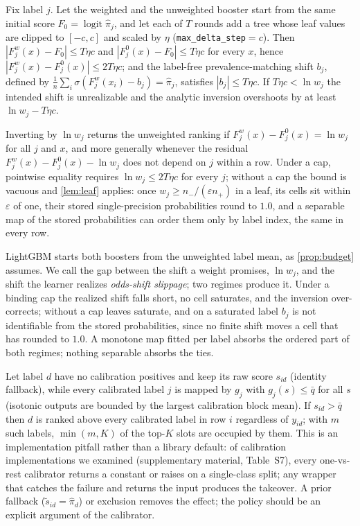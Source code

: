 \documentclass[runningheads]{llncs}
\newcommand{\Supp}[1]{supplementary material, #1}  %
\begin{document}
\begin{proposition}
\label{prop:budget}
Fix label $j$. Let the weighted and the unweighted booster start from the same initial score $F_0=\operatorname{logit}\hat\pi_j$, and let each of $T$ rounds add a tree whose leaf values are clipped to $[-c,c]$ and scaled by $\eta$ (\texttt{max\_delta\_step}$=c$). Then $|F^{w}_j(x)-F_0|\le T\eta c$ and $|F^{0}_j(x)-F_0|\le T\eta c$ for every $x$, hence $|F^{w}_j(x)-F^{0}_j(x)|\le 2T\eta c$; and the label-free prevalence-matching shift $b_j$, defined by $\frac1n\sum_i\sigma(F^{w}_j(x_i)-b_j)=\hat\pi_j$, satisfies $|b_j|\le T\eta c$. If $T\eta c<\ln w_j$ the intended shift is unrealizable and the analytic inversion overshoots by at least $\ln w_j-T\eta c$.
\end{proposition}
\begin{corollary}
\label{cor:exact}
Inverting by $\ln w_j$ returns the unweighted ranking if $F^{w}_j(x)-F^{0}_j(x)=\ln w_j$ for all $j$ and $x$, and more generally whenever the residual $F^{w}_j(x)-F^{0}_j(x)-\ln w_j$ does not depend on $j$ within a row. Under a cap, pointwise equality requires $\ln w_j\le 2T\eta c$ for every $j$; without a cap the bound is vacuous and \cref{lem:leaf} applies: once $w_j\ge n_-/(\varepsilon n_+)$ in a leaf, its cells sit within $\varepsilon$ of one, their stored single-precision probabilities round to $1.0$, and a separable map of the stored probabilities can order them only by label index, the same in every row.
\end{corollary}
LightGBM starts both boosters from the unweighted label mean, as \cref{prop:budget} assumes. We call the gap between the shift a weight promises, $\ln w_j$, and the shift the learner realizes \emph{odds-shift slippage}; two regimes produce it. Under a binding cap the realized shift falls short, no cell saturates, and the inversion over-corrects; without a cap leaves saturate, and on a saturated label $b_j$ is not identifiable from the stored probabilities, since no finite shift moves a cell that has rounded to $1.0$. A monotone map fitted per label absorbs the ordered part of both regimes; nothing separable absorbs the ties.

\begin{remark}
\label{prop:dead}
Let label $d$ have no calibration positives and keep its raw score $s_{id}$ (identity fallback), while every calibrated label $j$ is mapped by $g_j$ with $g_j(s)\le\bar q$ for all $s$ (isotonic outputs are bounded by the largest calibration block mean). If $s_{id}>\bar q$ then $d$ is ranked above every calibrated label in row $i$ regardless of $y_{id}$; with $m$ such labels, $\min(m,K)$ of the top-$K$ slots are occupied by them. This is an implementation pitfall rather than a library default: of \nnSurveyImpl{} calibration implementations we examined (\Supp{Table~S7}), every one-vs-rest calibrator returns a constant or raises on a single-class split; any wrapper that catches the failure and returns the input produces the takeover. A prior fallback ($\tilde s_{id}=\hat\pi_d$) or exclusion removes the effect; the policy should be an explicit argument of the calibrator.
\end{remark}
\end{document}
